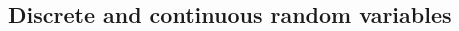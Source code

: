 \documentclass[11pt,singlecolumn, openany, citestyle=authoryear]{elegantbook}
\begin{document}
\begin{CJK}{UTF8}{gbsn}


\chapter{Discrete and continuous random variables}

\end{CJK}
\end{document}
